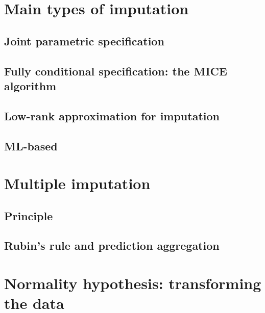 	\section{Main types of imputation}
		\subsection{Joint parametric specification}
		\subsection{Fully conditional specification: the MICE algorithm}
		\subsection{Low-rank approximation for imputation}
		\subsection{ML-based}
	\section{Multiple imputation}
		\subsection{Principle}
		\subsection{Rubin's rule and prediction aggregation}
	\section{Normality hypothesis: transforming the data}